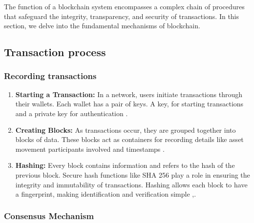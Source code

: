 The function of a blockchain system encompasses a complex chain of procedures that safeguard the  integrity, transparency, and security of transactions. In this section, 
we delve into the fundamental mechanisms of blockchain.

\subsection{Transaction process}

\subsubsection{Recording transactions}

\begin{enumerate}
    \item \textbf{Starting a Transaction:} In a network, users initiate transactions through their wallets. Each wallet has a pair of keys. A key, for starting transactions 
    and a private key for authentication \cite{9596538}.
    \item \textbf{Creating Blocks:} As transactions occur, they are grouped together into blocks of data. These blocks act as containers for recording details like 
    asset movement participants involved and timestamps \cite{ibm_blockchain}.
    \item \textbf{Hashing:} Every block contains information and refers to the hash of the previous block. Secure hash functions like SHA 256 play a role in ensuring the 
    integrity and immutability of transactions. Hashing allows each block to have a fingerprint, making identification and verification simple \cite{ibm_blockchain} ,\cite{9036241}.
\end{enumerate}

\subsubsection{Consensus Mechanism}

